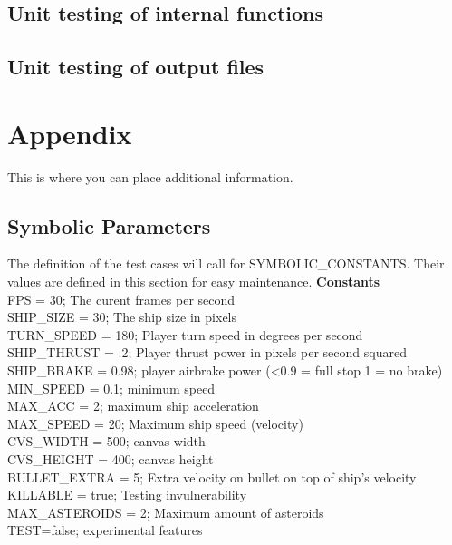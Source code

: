 \documentclass[12pt, titlepage]{article}
\begin{document}
\subsection{Unit testing of internal functions}

\subsection{Unit testing of output files}





\newpage

\section{Appendix}

This is where you can place additional information.

\subsection{Symbolic Parameters}

The definition of the test cases will call for SYMBOLIC\_CONSTANTS.
Their values are defined in this section for easy maintenance.
\textbf{Constants}\\
FPS = 30; The curent frames per second\\
SHIP\_SIZE = 30; The ship size in pixels\\
TURN\_SPEED = 180; Player turn speed in degrees per second\\
SHIP\_THRUST = .2; Player thrust power in pixels per second squared \\
SHIP\_BRAKE = 0.98; player airbrake power (<0.9 = full stop 1 = no brake) \\
MIN\_SPEED = 0.1; minimum speed \\
MAX\_ACC = 2; maximum ship acceleration \\
MAX\_SPEED = 20; Maximum ship speed (velocity) \\
CVS\_WIDTH = 500; canvas width \\
CVS\_HEIGHT = 400; canvas height \\
BULLET\_EXTRA = 5; Extra velocity on bullet on top of ship's velocity \\
KILLABLE = true; Testing invulnerability \\
MAX\_ASTEROIDS = 2; Maximum amount of asteroids \\
TEST=false; experimental features \\
\end{document}
